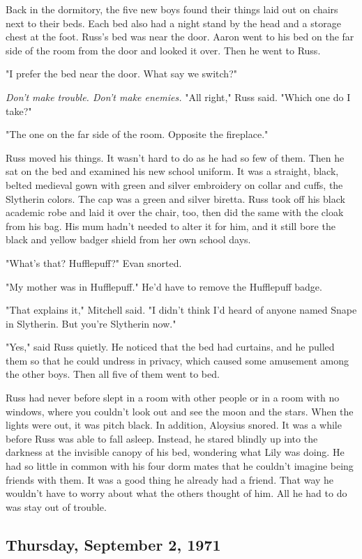 Back in the dormitory, the five new boys found their things laid out on chairs next to their beds. Each bed also had a night stand by the head and a storage chest at the foot. Russ's bed was near the door. Aaron went to his bed on the far side of the room from the door and looked it over. Then he went to Russ.

"I prefer the bed near the door. What say we switch?"

\emph{Don't make trouble. Don't make enemies.} "All right," Russ said. "Which one do{\el} I take?"

"The one on the far side of the room. Opposite the fireplace."

Russ moved his things. It wasn't hard to do as he had so few of them. Then he sat on the bed and examined his new school uniform. It was a straight, black, belted medieval gown with green and silver embroidery on collar and cuffs, the Slytherin colors. The cap was a green and silver biretta. Russ took off his black academic robe and laid it over the chair, too, then did the same with the cloak from his bag. His mum hadn't needed to alter it for him, and it still bore the black and yellow badger shield from her own school days.

"What's that? Hufflepuff?" Evan snorted.

"My mother was{\el} in Hufflepuff." He'd have to remove the Hufflepuff badge.

"That explains it," Mitchell said. "I didn't think I'd heard of anyone named Snape in Slytherin. But you're Slytherin now."

"Yes," said Russ quietly. He noticed that the bed had curtains, and he pulled them so that he could undress in privacy, which caused some amusement among the other boys. Then all five of them went to bed.

Russ had never before slept in a room with other people or in a room with no windows, where you couldn't look out and see the moon and the stars. When the lights were out, it was pitch black. In addition, Aloysius snored. It was a while before Russ was able to fall asleep. Instead, he stared blindly up into the darkness at the invisible canopy of his bed, wondering what Lily was doing. He had so little in common with his four dorm mates that he couldn't imagine being friends with them. It was a good thing he already had a friend. That way he wouldn't have to worry about what the others thought of him. All he had to do was stay out of trouble.

\subsection{Thursday, September 2, 1971}

